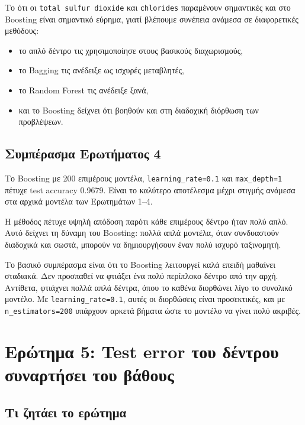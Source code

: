 \documentclass[12pt,a4paper]{article}
\newcommand{\code}[1]{\texttt{\textenglish{#1}}}
\begin{document}
Το ότι οι \code{total sulfur dioxide} και \code{chlorides} παραμένουν
σημαντικές και στο Boosting είναι σημαντικό εύρημα, γιατί βλέπουμε συνέπεια
ανάμεσα σε διαφορετικές μεθόδους:

\begin{itemize}
    \item το απλό δέντρο τις χρησιμοποίησε στους βασικούς διαχωρισμούς,
    \item το Bagging τις ανέδειξε ως ισχυρές μεταβλητές,
    \item το Random Forest τις ανέδειξε ξανά,
    \item και το Boosting δείχνει ότι βοηθούν και στη διαδοχική διόρθωση των
    προβλέψεων.
\end{itemize}

\subsection{Συμπέρασμα Ερωτήματος 4}

Το Boosting με 200 επιμέρους μοντέλα, \code{learning\_rate=0.1} και
\code{max\_depth=1} πέτυχε test accuracy 0.9679. Είναι το καλύτερο αποτέλεσμα
μέχρι στιγμής ανάμεσα στα αρχικά μοντέλα των Ερωτημάτων 1--4.

Η μέθοδος πέτυχε υψηλή απόδοση παρότι κάθε επιμέρους δέντρο ήταν πολύ απλό.
Αυτό δείχνει τη δύναμη του Boosting: πολλά απλά μοντέλα, όταν συνδυαστούν
διαδοχικά και σωστά, μπορούν να δημιουργήσουν έναν πολύ ισχυρό ταξινομητή.

Το βασικό συμπέρασμα είναι ότι το Boosting λειτουργεί καλά επειδή μαθαίνει
σταδιακά. Δεν προσπαθεί να φτιάξει ένα πολύ περίπλοκο δέντρο από την αρχή.
Αντίθετα, φτιάχνει πολλά απλά δέντρα, όπου το καθένα διορθώνει λίγο το
συνολικό μοντέλο. Με \code{learning\_rate=0.1}, αυτές οι διορθώσεις είναι
προσεκτικές, και με \code{n\_estimators=200} υπάρχουν αρκετά βήματα ώστε το
μοντέλο να γίνει πολύ ακριβές.

\section{Ερώτημα 5: Test error του δέντρου συναρτήσει του βάθους}

\subsection{Τι ζητάει το ερώτημα}
\end{document}
